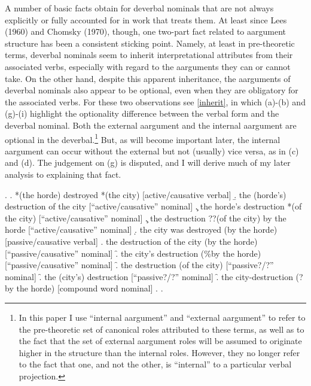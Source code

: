 \documentclass[12pt]{article}
\begin{document}
A number of basic facts obtain for deverbal nominals that are not always explicitly or fully accounted for in work that treats them. At least since Lees (1960) and Chomsky (1970), though, one two-part fact related to aargument structure has been a consistent sticking point. Namely, at least in pre-theoretic terms, deverbal nominals seem to inherit interpretational attributes from their associated verbs, especially with regard to the aarguments they can or cannot take. On the other hand, despite this apparent inheritance, the aarguments of deverbal nominals also appear to be optional, even when they are obligatory for the associated verbs. For these two observations see \ref{inherit}, in which (a)-(b) and (g)-(i) highlight the optionality difference between the verbal form and the deverbal nominal. Both the external aargument and the internal aargument are optional in the deverbal.\footnote{ In this paper I use ``internal aargument'' and ``external aargument'' to refer to the pre-theoretic set of canonical roles attributed to these terms, as well as to the fact that the set of external aargument roles will be assumed to originate higher in the structure than the internal roles. However, they no longer refer to the fact that one, and not the other, is ``internal'' to a particular verbal projection.} But, as will become important later, the internal aargument can occur without the external but not (usually) vice versa, as in (c) and (d). The judgement on (g) is disputed, and I will derive much of my later analysis to explaining that fact.

\singlespacing
\ex. \label{inherit}
\a. *(the horde) destroyed *(the city) \hfill [active/causative verbal]
\b. the (horde's) destruction of the city \hfill [``active/causative'' nominal]
\c. \label{inherit4} the horde's destruction *(of the city) \hfill [``active/causative'' nominal]
\c. \label{inherit3} the destruction ??(of the city) by the horde \hfill [``active/causative'' nominal]
\d. the city was destroyed (by the horde) \hfill [passive/causative verbal]
\e. the destruction of the city (by the horde) \hfill [``passive/causative'' nominal]
\f. the city's destruction (\%by the horde) \hfill [``passive/causative'' nominal]
\f. \label{inherit1} the destruction (of the city) \hfill [``passive?/?'' nominal]
\f. \label{inherit2} the (city's) destruction \hfill [``passive?/?'' nominal]
\f. the city-destruction (?by the horde) \hfill [compound word nominal]
\z. \z. \par

\doublespacing
\end{document}
